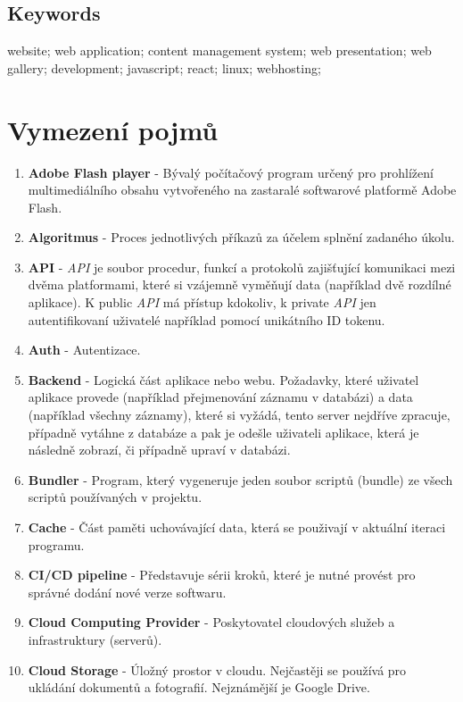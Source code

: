 \documentclass[12pt,a4paper]{report}
\begin{document}
  \section*{Keywords}
  \noindent website; web application; content management system; web presentation; web gallery; development; javascript; react; linux; webhosting;  

  \clearpage
  
  \tableofcontents
  
  \clearpage

  \chapter{Vymezení pojmů}
  \begin{enumerate}
    \item \textbf{Adobe Flash player} - Bývalý počítačový program určený pro prohlížení multimediálního obsahu vytvořeného na zastaralé softwarové platformě Adobe Flash.
    \item \textbf{Algoritmus} - Proces jednotlivých příkazů za účelem splnění zadaného úkolu.
    \item \textbf{API} - \emph{API} je soubor procedur, funkcí a protokolů zajišťující komunikaci mezi dvěma platformami, které si vzájemně vyměňují data (například dvě rozdílné aplikace). K public \emph{API} má přístup kdokoliv, k private \emph{API} jen autentifikovaní uživatelé například pomocí unikátního ID tokenu.
    \item \textbf{Auth} - Autentizace.
    \item \textbf{Backend} -  Logická část aplikace nebo webu. Požadavky, které uživatel aplikace provede (například přejmenování záznamu v databázi) a data (například všechny záznamy), které si vyžádá, tento server nejdříve zpracuje, případně vytáhne z databáze a pak je odešle uživateli aplikace, která je následně zobrazí, či případně upraví v databázi.
    \item \textbf{Bundler} - Program, který vygeneruje jeden soubor scriptů (bundle) ze všech scriptů používaných v projektu. 
    \item \textbf{Cache} - Část paměti uchovávající data, která se použivají v aktuální iteraci programu.
    \item \textbf{CI/CD pipeline} - Představuje sérii kroků, které je nutné provést pro správné dodání nové verze softwaru.
    \item \textbf{Cloud Computing Provider} - Poskytovatel cloudových služeb a infrastruktury (serverů).
    \item \textbf{Cloud Storage} - Úložný prostor v cloudu. Nejčastěji se používá pro ukládání dokumentů a fotografií. Nejznámější je Google Drive.

\end{enumerate}
\end{document}
